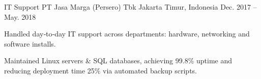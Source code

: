 \begin{cventries}
    \cventry
    {IT Support} %
    {PT Jasa Marga (Persero) Tbk} %
    {Jakarta Timur, Indonesia} %
    {Dec. 2017 – May. 2018} %
    {
      \begin{cvitems} %
        \item {Handled day‑to‑day IT support across departments: hardware, networking and software installs.}
        \item {Maintained Linux servers \& SQL databases, achieving 99.8\% uptime and reducing deployment time 25\% via automated backup scripts.}
      \end{cvitems}
    }
\end{cventries}